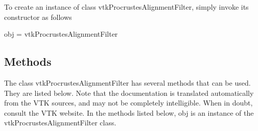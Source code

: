 To create an instance of class vtk\-Procrustes\-Alignment\-Filter, simply invoke its constructor as follows \begin{DoxyVerb}  obj = vtkProcrustesAlignmentFilter
\end{DoxyVerb}
 \hypertarget{vtkwidgets_vtkxyplotwidget_Methods}{}\subsection{Methods}\label{vtkwidgets_vtkxyplotwidget_Methods}
The class vtk\-Procrustes\-Alignment\-Filter has several methods that can be used. They are listed below. Note that the documentation is translated automatically from the V\-T\-K sources, and may not be completely intelligible. When in doubt, consult the V\-T\-K website. In the methods listed below, {\ttfamily obj} is an instance of the vtk\-Procrustes\-Alignment\-Filter class. 
